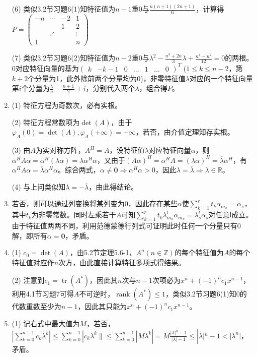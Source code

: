 \documentclass[a4paper,UTF8,fontset=windows]{ctexart}
\DeclareMathOperator{\rank}{rank}
\DeclareMathOperator{\tr}{tr}
\begin{document}
\begin{enumerate}
(6) 类似3.2节习题6(1)知特征值为$n-1$重0与$\frac{n(n+1)(2n+1)}{6}$，计算得$P=\begin{pmatrix}-n&\cdots&-2&1\\&&1&2\\&\iddots&&\vdots\\1&&&n\end{pmatrix}$

(7) 类似3.2节习题6(2)知特征值为$n-2$重0与$\lambda^2-\frac{n^3+2n}{3}\lambda+\frac{n^4-n^2}{12}=0$的两根。0对应特征向量的基为$\begin{pmatrix}k&-k-1&0&\dots&1&\dots&0\end{pmatrix}^T$ ($1\le k\le n-2$，第$k+2$个分量为1，此外除前两个分量均为0)，非零特征值$\lambda$对应的一个特征向量第$i$个分量为$\frac{\lambda}{n}-\frac{n+1}{2}+i$，分别代入两个$\lambda$，组合得$P$。

\item
(1) 特征方程为奇数次，必有实根。

(2) 特征方程常数项为$\det(A)$，由于$\varphi_A(0)=\det(A),\varphi_A(+\infty)=+\infty$，若否，由介值定理知存实根。

(3) 由$A$为实对称方阵，$A^H=A$，设特征值$\lambda$对应特征向量$\alpha$，则$\alpha^HA\alpha=\alpha^H(\lambda\alpha)=\lambda\alpha^H\alpha$，又由于$(A\alpha)^H=\alpha^HA=(\lambda\alpha)^H=\overline{\lambda}\alpha^H$，有$\alpha^HA\alpha=\overline{\lambda}\alpha^H\alpha$。综合两式，$\alpha\ne\mathbf{0}\Rightarrow \alpha^H\alpha>0$，因此$\lambda=\overline{\lambda}\Rightarrow\lambda\in\mathbb{R}$。

(4) 与上问类似知$\lambda=-\overline{\lambda}$，由此得结论。

\item
若否，则可以通过列变换将某列变为0，因此存在某些$\alpha$使$\sum_{k=1}^{r}{t_k\alpha_{m_k}}=\alpha_s$，其中$t_k$为非零常数。同时左乘若干$A$可知$\sum_{k=1}^{r}{t_k\lambda_{m_k}^l\alpha_{m_k}}=\lambda_s^l\alpha_s$对任意l成立。由于特征值两两不同，利用范德蒙德行列式可证明此时任何一个分量只有0解，即所有$\alpha=\mathbf{0}$，矛盾。

\item
(1) $c_0=\det(A)$，由5.2节定理5.6-1，$A^n(n\in\mathbb{Z})$的每个特征值为$A$的每个特征值对应作$n$次方，由此直接计算特征多项式得结果。

(2) 注意到$c_1=\tr(A^\ast)$，因此其$n$次与$n-1$次项必为$x^n+(-1)^nc_1x^{n-1}$，利用4.1节习题7可得$A$不可逆时，$\rank(A^\ast)\le1$，类似3.2节习题6(1)知0的代数重数至少为$n-1$，因此其只能为$x^n+(-1)^nc_1x^{n-1}$。

\item
(1) 记右式中最大值为$M$，若否，$\left|\sum_{k=0}^{n-1}{c_k\lambda^k}\right|\le\sum_{k=0}^{n-1}|c_k\lambda^k\|\le\sum_{k=0}^{n-1}|M\lambda^k|=M\frac{|\lambda|^n-1}{|\lambda|-1}\le|\lambda|^n-1<|\lambda^n|$，矛盾。


\end{enumerate}
\end{document}
